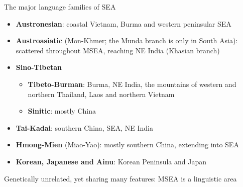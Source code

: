 \documentclass{beamer}
\begin{document}
\begin{frame}{The major language families of SEA}
  \begin{itemize}

\item \textbf{Austronesian}: coastal Vietnam, Burma and western peninsular SEA

\item \textbf{Austroasiatic} (Mon-Khmer; the Munda branch is only in South
  Asia): scattered throughout MSEA, reaching NE India (Khasian branch)

\item \textbf{Sino-Tibetan}
\begin{itemize}
\item \textbf{Tibeto-Burman}: Burma, NE India, the mountains of western and
  northern Thailand, Laos and northern Vietnam
\item \textbf{Sinitic}: mostly China
\end{itemize}

\item \textbf{Tai-Kadai}: southern China, SEA, NE India

\item \textbf{Hmong-Mien} (Miao-Yao): mostly southern China, extending into SEA
\item \textbf{Korean, Japanese and Ainu}: Korean Peninsula and Japan
\end{itemize}  
Genetically unrelated, yet sharing many features: MSEA is a linguistic area

\end{frame}
\end{document}
